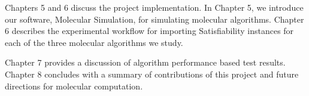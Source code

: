 Chapters 5 and 6 discuss the project implementation.  In Chapter 5, we introduce our software, Molecular Simulation, for simulating molecular algorithms.  Chapter 6 describes the experimental workflow for importing {\sc Satisfiability} instances for each of the three molecular algorithms we study.

Chapter 7 provides a discussion of algorithm performance based test results.  Chapter 8 concludes with a summary of contributions of this project and future directions for molecular computation.